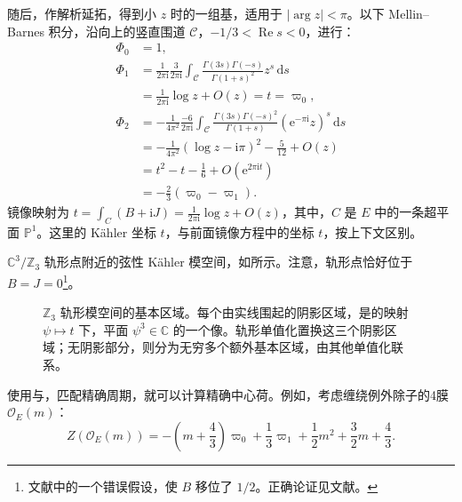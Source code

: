 随后，作解析延拓，得到小 $z$ 时的一组基，适用于 $|\arg z|<\pi$。以下 Mellin--Barnes 积分，沿向上的竖直围道 $\mathcal{C}$，$-1/3<\operatorname{Re}s<0$，进行：
\begin{equation}\label{eq:5.168}
\begin{aligned}
\Phi_0&=1,\\
\Phi_1&=\frac{1}{2\pi\mathrm{i}}\frac{3}{2\pi\mathrm{i}}
\int_{\mathcal{C}}\frac{\Gamma(3s)\Gamma(-s)}{\Gamma(1+s)^2}z^s\,\mathrm{d}s\\
&=\frac{1}{2\pi\mathrm{i}}\log z+O(z)=t=\varpi_0,\\[4pt]
\Phi_2&=-\frac{1}{4\pi^2}\frac{-6}{2\pi\mathrm{i}}
\int_{\mathcal{C}}\frac{\Gamma(3s)\Gamma(-s)^2}{\Gamma(1+s)}
(\mathrm{e}^{-\pi\mathrm{i}}z)^s\,\mathrm{d}s\\
&=-\frac{1}{4\pi^2}(\log z-\mathrm{i}\pi)^2-\frac5{12}+O(z)\\
&=t^2-t-\frac16+O(\mathrm{e}^{2\pi\mathrm{i}t})\\
&=-\frac23(\varpi_0-\varpi_1).
\end{aligned}
\end{equation}
镜像映射为 $t=\int_C(B+\mathrm{i}J)=\tfrac{1}{2\pi\mathrm{i}}\log z+O(z)$，其中，$C$ 是 $E$ 中的一条超平面 $\mathbb{P}^1$。这里的 K\"ahler 坐标 $t$，与前面镜像方程中的坐标 $t$，按上下文区别。

$\mathbb{C}^3/\mathbb{Z}_3$ 轨形点附近的弦性 K\"ahler 模空间，如所示。注意，轨形点恰好位于 $B=J=0$\footnote{文献中的一个错误假设，使 $B$ 移位了 $1/2$。正确论证见文献。}。
\begin{figure}[H]
\centering
{}
\caption{$\mathbb{Z}_3$ 轨形模空间的基本区域。每个由实线围起的阴影区域，是的映射 $\psi\mapsto t$ 下，平面 $\psi^3\in\mathbb{C}$ 的一个像。轨形单值化置换这三个阴影区域；无阴影部分，则分为无穷多个额外基本区域，由其他单值化联系。}\label{fig:5.12}
\end{figure}

使用与，匹配精确周期，就可以计算精确中心荷。例如，考虑缠绕例外除子的4膜 $\mathcal{O}_E(m)$：
\begin{equation}\label{eq:5.169}
Z(\mathcal{O}_E(m))
=-\left(m+\frac43\right)\varpi_0+\frac13\varpi_1
+\frac12m^2+\frac32m+\frac43.
\end{equation}

